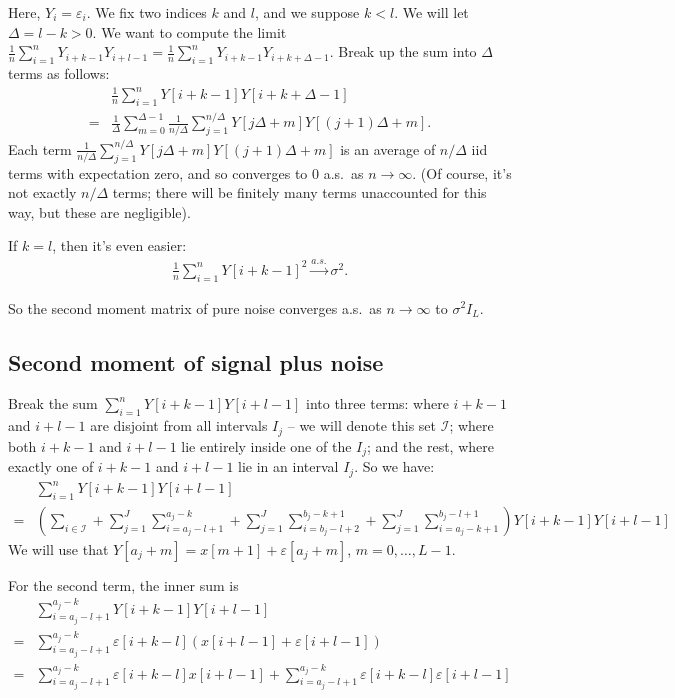 \documentclass{article}
\theoremstyle{thm}
\theoremstyle{definition}
\newcommand{\I}{\mathcal{I}}
\newcommand{\ep}{\varepsilon}
\begin{document}
Here, $Y_i = \ep_i$. We fix two indices $k$ and $l$, and we suppose $k < l$. We will let $\Delta = l-k > 0$. We want to compute the limit $\frac{1}{n} \sum_{i=1}^n Y_{i + k - 1} Y_{i + l - 1} = \frac{1}{n} \sum_{i=1}^n Y_{i + k - 1} Y_{i + k + \Delta - 1}$. Break up the sum into $\Delta$ terms as follows:
%
\begin{align}
%
    &\frac{1}{n} \sum_{i=1}^n Y[i + k - 1]  Y[i + k+\Delta - 1]   
    \nonumber \\
    =& \frac{1}{\Delta} \sum_{m=0}^{\Delta-1} \frac{1}{n/\Delta}\sum_{j=1}^{n/\Delta} 
                      Y[j\Delta + m] Y[(j + 1)\Delta + m].
%
\end{align}
%
Each term
%
\begin{math}
    \frac{1}{n/\Delta}\sum_{j=1}^{n/\Delta} 
                      Y[j\Delta + m] Y[(j + 1)\Delta + m]
\end{math}
%
is an average of $n / \Delta$ iid terms with expectation zero, and so converges to 0 a.s.\ as $n \to \infty$. (Of course, it's not exactly $n / \Delta$ terms; there will be finitely many terms unaccounted for this way, but these are negligible).


If $k = l$, then it's even easier:
%
\begin{align}
%
    \frac{1}{n} \sum_{i=1}^n Y[i + k - 1]^2 \operatorname*{\longrightarrow}^{a.s.} \sigma^2.
%
\end{align}

So the second moment matrix of pure noise converges a.s.\ as $n \to \infty$ to $\sigma^2 I_L$.


\subsection{Second moment of signal plus noise}



Break the sum $\sum_{i=1}^n Y[i + k-1] Y[i + l - 1]$ into three terms: where $i + k-1$ and $i+l-1$ are disjoint from all intervals $I_j$ -- we will denote this set $\I$; where both $i + k - 1$ and $i + l -1$ lie entirely inside one of the $I_j$; and the rest, where exactly one of $i+k-1$ and $i+l-1$ lie in an interval $I_j$. So we have:
%
\begin{align}
%
    & \sum_{i=1}^n Y[i+k-1] Y[i+l-1]    \nonumber \\
    =& \left(\sum_{i \in \I}  
        + \sum_{j=1}^J \sum_{i=a_j - l + 1}^{a_j - k} 
        + \sum_{j=1}^J \sum_{i=b_j - l + 2}^{b_j - k+1} 
        + \sum_{j=1}^J \sum_{i=a_j-k+1}^{b_j-l+1}
      \right)  Y[i+k-1] Y[i+l-1]
%
\end{align}
We will use that $Y[a_j + m] = x[m+1] + \ep[a_j+m]$, $m=0,\dots,L-1$. 

For the second term, the inner sum is
%
\begin{align}
%
    &\sum_{i=a_j - l + 1}^{a_j - k} Y[i+k-1] Y[i+l-1]    \nonumber \\
    =& \sum_{i=a_j - l + 1}^{a_j - k} \ep[i+k-l] (x[i+l-1] + \ep[i+l-1])
    \nonumber \\
    =& \sum_{i=a_j - l + 1}^{a_j - k} \ep[i+k-l] x[i+l-1] 
        + \sum_{i=a_j - l + 1}^{a_j - k} \ep[i+k-l]\ep[i+l-1]
%
\end{align}
%
\end{document}
